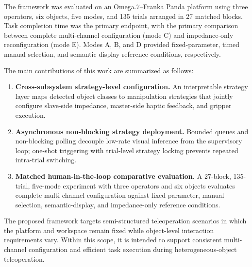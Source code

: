 The framework was evaluated on an Omega.7--Franka Panda platform using three operators, six objects, five modes, and 135 trials arranged in 27 matched blocks. Task completion time was the primary endpoint, with the primary comparison between complete multi-channel configuration (mode C) and impedance-only reconfiguration (mode E). Modes A, B, and D provided fixed-parameter, timed manual-selection, and semantic-display reference conditions, respectively.

The main contributions of this work are summarized as follows:

\begin{enumerate}
\item \textbf{Cross-subsystem strategy-level configuration.} An interpretable strategy layer maps detected object classes to manipulation strategies that jointly configure slave-side impedance, master-side haptic feedback, and gripper execution.
\item \textbf{Asynchronous non-blocking strategy deployment.} Bounded queues and non-blocking polling decouple low-rate visual inference from the supervisory loop; one-shot triggering with trial-level strategy locking prevents repeated intra-trial switching.
\item \textbf{Matched human-in-the-loop comparative evaluation.} A 27-block, 135-trial, five-mode experiment with three operators and six objects evaluates complete multi-channel configuration against fixed-parameter, manual-selection, semantic-display, and impedance-only reference conditions.
\end{enumerate}

The proposed framework targets semi-structured teleoperation scenarios in which the platform and workspace remain fixed while object-level interaction requirements vary. Within this scope, it is intended to support consistent multi-channel configuration and efficient task execution during heterogeneous-object teleoperation.
